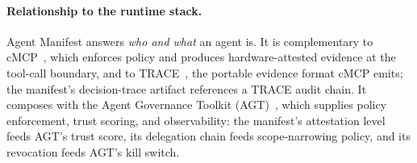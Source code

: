 \paragraph{Relationship to the runtime stack.}
Agent Manifest answers \emph{who and what} an agent is. It is complementary to
cMCP~\citep{cmcp2026}, which enforces policy and produces hardware-attested evidence
at the tool-call boundary, and to TRACE~\citep{trace2026}, the portable evidence
format cMCP emits; the manifest's decision-trace artifact references a TRACE
audit chain. It composes with the Agent Governance Toolkit (AGT)~\citep{agt2026},
which supplies policy enforcement, trust scoring, and observability: the manifest's
attestation level feeds AGT's trust score, its delegation chain feeds scope-narrowing
policy, and its revocation feeds AGT's kill switch.

